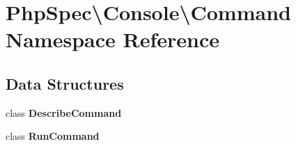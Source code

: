 \section{Php\+Spec\textbackslash{}Console\textbackslash{}Command Namespace Reference}
\label{namespace_php_spec_1_1_console_1_1_command}
\subsection*{Data Structures}
\begin{DoxyCompactItemize}
\item 
class {\bf Describe\+Command}
\item 
class {\bf Run\+Command}
\end{DoxyCompactItemize}
